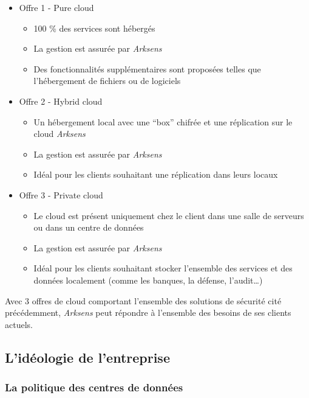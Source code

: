\documentclass[a4paper,10pt, twoside]{report}
\begin{document}
\begin{spacing}{1.2}
\begin{itemize}
  \item Offre 1 - Pure cloud
  \noindent
  \begin{itemize}
    \item 100 \% des services sont h\'eberg\'es
    \item La gestion est assur\'ee par \textit{Arksens}
    \item Des fonctionnalit\'es suppl\'ementaires sont propos\'ees telles que
    l'h\'ebergement de fichiers ou de logiciels
  \end{itemize}
  \item Offre 2 - Hybrid cloud
  \noindent
  \begin{itemize}
    \item Un h\'ebergement local avec une ``box'' chifr\'ee et une
    r\'eplication sur le cloud \textit{Arksens}
    \item La gestion est assur\'ee par \textit{Arksens}
    \item Id\'eal pour les clients souhaitant une r\'eplication dans leurs
    locaux
  \end{itemize}
  \item Offre 3 - Private cloud
  \noindent
  \begin{itemize}
    \item Le cloud est pr\'esent uniquement chez le client dans une salle de
    serveurs ou dans un centre de donn\'ees
    \item La gestion est assur\'ee par \textit{Arksens}
    \item Id\'eal pour les clients souhaitant stocker l'ensemble des services
    et des donn\'ees localement (comme les banques, la d\'efense,
    l'audit\ldots{})
  \end{itemize}
\end{itemize}

Avec 3 offres de cloud comportant l'ensemble des solutions de s\'ecurit\'e
cité pr\'ec\'edemment, \textit{Arksens} peut répondre à l'ensemble des besoins
de ses clients actuels.

\subsection{L'id\'eologie de l'entreprise}
\subsubsection{La politique des centres de données}


\end{spacing}
\end{document}
